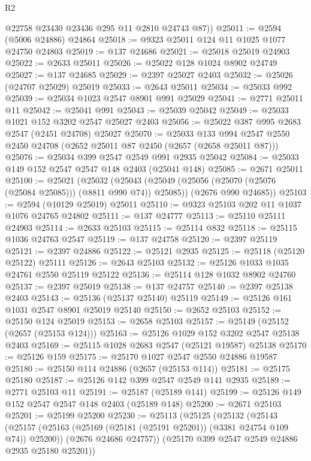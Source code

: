 \begin{lexlean}{R2}
\begin{coremodule}
        @22758
        @23430
        @23436
        @295
        @11
        @2810
        @24743
        @87))
@25011 := @2594 (@5006 @24886) @24864
@25018 := @9323 @25011 @124 @11 @1025 @1077 @24750 @24803
@25019 := @137 @24686
@25021 := @25018 @25019 @24903
@25022 := @2633 @25011
@25026 := @25022 @128 @1024 @8902 @24749
@25027 := @137 @24685
@25029 := @2397 @25027 @2403
@25032 := @25026 (@24707 @25029) @25019
@25033 := @2643 @25011
@25034 := @25033 @992
@25039 := @25034 @1023 @2547 @8901 @991 @25029
@25041 := @2771 @25011 @11
@25042 := @25041 @991
@25043 := @25039 @25042
@25049 := @25033 @1021 @152 @3202 @2547 @25027 @2403
@25056 := @25022 @387 @995 @2683 @2547 (@2451 @24708) @25027
@25070 := @25033
    @133
    @994
    @2547
    @2550
    @2450
    @24708
    (@2652 @25011 @87 @2450 (@2657 (@2658 @25011 @87)))
@25076 := @25034 @399 @2547 @2549 @991 @2935 @25042
@25084 := @25033 @149 @152 @2547 @2547 @148 @2403 (@25041 @148)
@25085 := @2671 @25011
@25100 := @25021
    (@25032
      (@25043 (@25049 (@25056 (@25070 (@25076 (@25084 @25085))) (@8811 @990 @74)) @25085))
      (@2676 @990 @24685))
@25103 := @2594 (@10129 @25019) @25011
@25110 := @9323 @25103 @202 @11 @1037 @1076 @24765 @24802
@25111 := @137 @24777
@25113 := @25110 @25111 @24903
@25114 := @2633 @25103
@25115 := @25114 @832
@25118 := @25115 @1036 @24763 @2547
@25119 := @137 @24758
@25120 := @2397 @25119
@25121 := @2397 @24886
@25122 := @25121 @2935
@25125 := @25118 (@25120 @25122) @25111
@25126 := @2643 @25103
@25132 := @25126 @1033 @1035 @24761 @2550 @25119 @25122
@25136 := @25114 @128 @1032 @8902 @24760
@25137 := @2397 @25019
@25138 := @137 @24757
@25140 := @2397 @25138 @2403
@25143 := @25136 (@25137 @25140) @25119
@25149 := @25126 @161 @1031 @2547 @8901 @25019 @25140
@25150 := @2652 @25103
@25152 := @25150 @124 @25019
@25153 := @2658 @25103
@25157 := @25149 (@25152 (@2657 (@25153 @124)))
@25163 := @25126 @1029 @152 @3202 @2547 @25138 @2403
@25169 := @25115 @1028 @2683 @2547 (@25121 @19587) @25138
@25170 := @25126 @159
@25175 := @25170 @1027 @2547 @2550 @24886 @19587
@25180 := @25150 @114 @24886 (@2657 (@25153 @114))
@25181 := @25175 @25180
@25187 := @25126 @142 @399 @2547 @2549 @141 @2935
@25189 := @2771 @25103 @11
@25191 := @25187 (@25189 @141)
@25199 := @25126 @149 @152 @2547 @2547 @148 @2403 (@25189 @148)
@25200 := @2671 @25103
@25201 := @25199 @25200
@25230 := @25113
    (@25125
      (@25132
        (@25143
          (@25157 (@25163 (@25169 (@25181 (@25191 @25201)) (@3381 @24754 @109 @74)) @25200))
          (@2676 @24686 @24757))
        (@25170 @399 @2547 @2549 @24886 @2935 @25180 @25201))

\end{coremodule}
\end{lexlean}
